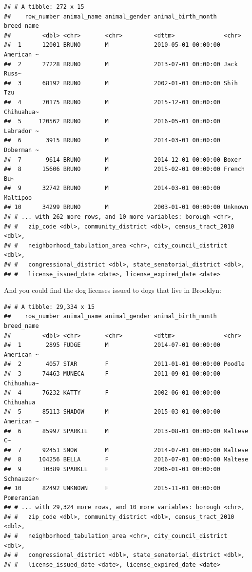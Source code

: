 \documentclass[]{Nemilov}
\newenvironment{Shaded}{\begin{snugshade}}{\end{snugshade}}
\newcommand{\KeywordTok}[1]{\textcolor[rgb]{0.13,0.29,0.53}{\textbf{#1}}}
\newcommand{\NormalTok}[1]{#1}
\newcommand{\OperatorTok}[1]{\textcolor[rgb]{0.81,0.36,0.00}{\textbf{#1}}}
\newcommand{\StringTok}[1]{\textcolor[rgb]{0.31,0.60,0.02}{#1}}
\begin{document}
\begin{verbatim}
## # A tibble: 272 x 15
##    row_number animal_name animal_gender animal_birth_month  breed_name
##         <dbl> <chr>       <chr>         <dttm>              <chr>     
##  1      12001 BRUNO       M             2010-05-01 00:00:00 American ~
##  2      27228 BRUNO       M             2013-07-01 00:00:00 Jack Russ~
##  3      68192 BRUNO       M             2002-01-01 00:00:00 Shih Tzu  
##  4      70175 BRUNO       M             2015-12-01 00:00:00 Chihuahua~
##  5     120562 BRUNO       M             2016-05-01 00:00:00 Labrador ~
##  6       3915 BRUNO       M             2014-03-01 00:00:00 Doberman ~
##  7       9614 BRUNO       M             2014-12-01 00:00:00 Boxer     
##  8      15606 BRUNO       M             2015-02-01 00:00:00 French Bu~
##  9      32742 BRUNO       M             2014-03-01 00:00:00 Maltipoo  
## 10      34299 BRUNO       M             2003-01-01 00:00:00 Unknown   
## # ... with 262 more rows, and 10 more variables: borough <chr>,
## #   zip_code <dbl>, community_district <dbl>, census_tract_2010 <dbl>,
## #   neighborhood_tabulation_area <chr>, city_council_district <dbl>,
## #   congressional_district <dbl>, state_senatorial_district <dbl>,
## #   license_issued_date <date>, license_expired_date <date>
\end{verbatim}

And you could find the dog licenses issued to dogs that live in Brooklyn:

\begin{Shaded}
\end{Shaded}

\begin{verbatim}
## # A tibble: 29,334 x 15
##    row_number animal_name animal_gender animal_birth_month  breed_name
##         <dbl> <chr>       <chr>         <dttm>              <chr>     
##  1       2895 FUDGE       M             2014-07-01 00:00:00 American ~
##  2       4057 STAR        F             2011-01-01 00:00:00 Poodle    
##  3      74463 MUNECA      F             2011-09-01 00:00:00 Chihuahua~
##  4      76232 KATTY       F             2002-06-01 00:00:00 Chihuahua 
##  5      85113 SHADOW      M             2015-03-01 00:00:00 American ~
##  6      85997 SPARKIE     M             2013-08-01 00:00:00 Maltese C~
##  7      92451 SNOW        M             2014-07-01 00:00:00 Maltese   
##  8     104256 BELLA       F             2016-07-01 00:00:00 Maltese   
##  9      10389 SPARKLE     F             2006-01-01 00:00:00 Schnauzer~
## 10      82492 UNKNOWN     F             2015-11-01 00:00:00 Pomeranian
## # ... with 29,324 more rows, and 10 more variables: borough <chr>,
## #   zip_code <dbl>, community_district <dbl>, census_tract_2010 <dbl>,
## #   neighborhood_tabulation_area <chr>, city_council_district <dbl>,
## #   congressional_district <dbl>, state_senatorial_district <dbl>,
## #   license_issued_date <date>, license_expired_date <date>
\end{verbatim}
\end{document}
